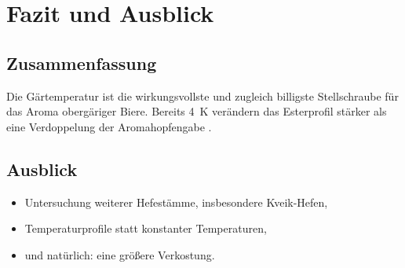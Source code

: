 \chapter{Fazit und Ausblick}
\label{ch:fazit}

\section{Zusammenfassung}
Die Gärtemperatur ist die wirkungsvollste und zugleich billigste Stellschraube für
das Aroma obergäriger Biere. Bereits \SI{4}{\kelvin} verändern das Esterprofil
stärker als eine Verdoppelung der Aromahopfengabe \citep{hopfner2019reinheit}.

\section{Ausblick}
\begin{itemize}
  \item Untersuchung weiterer Hefestämme, insbesondere Kveik-Hefen,
  \item Temperaturprofile statt konstanter Temperaturen,
  \item und natürlich: eine größere Verkostung.
\end{itemize}
